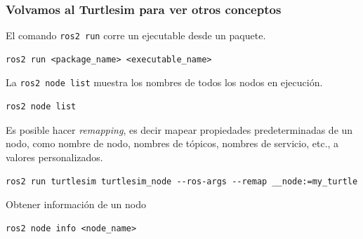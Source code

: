 \begin{frame}[fragile]
    \frametitle{Volvamos al Turtlesim para ver otros conceptos}
    
    El comando \lstinline[style=bash]{ros2 run} corre un ejecutable desde un paquete.
\begin{lstlisting}[style=bash]    
ros2 run <package_name> <executable_name>
\end{lstlisting}

    La \lstinline[style=bash]{ros2 node list} muestra los nombres de todos los nodos en ejecución.

\begin{lstlisting}[style=bash]    
ros2 node list
\end{lstlisting}

    Es posible hacer \emph{remapping}, es decir mapear propiedades predeterminadas de un nodo, como nombre de nodo, nombres de tópicos, nombres de servicio, etc., a valores personalizados.
    
\begin{lstlisting}[style=bash]    
ros2 run turtlesim turtlesim_node --ros-args --remap __node:=my_turtle
\end{lstlisting}

    Obtener información de un nodo
\begin{lstlisting}[style=bash]    
ros2 node info <node_name>
\end{lstlisting}
\end{frame}

